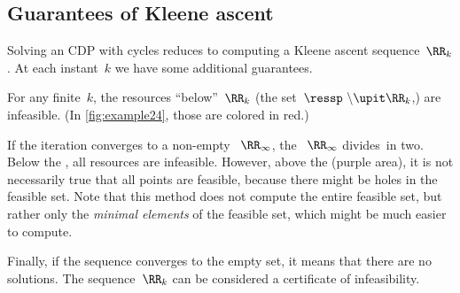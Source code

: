 \subsection{Guarantees of Kleene ascent}

Solving an CDP with cycles reduces to computing a Kleene ascent sequence~$\RR_{k}$.
At each instant~$k$ we have some additional guarantees.

For any finite~$k$, the resources ``below''~$\RR_{k}$ (the set~$\ressp\ \backslash\upit\RR_{k}$,) are infeasible.
(In \cref{fig:example24}, those are colored in red.)

If the iteration converges to a non-empty ~$\RR_{\infty}$, the ~$\RR_{\infty}$ divides~\ressp in two.
Below the , all resources are infeasible.
However, above the  (purple area), it is not necessarily true that all points are feasible, because there might be holes in the feasible set.
Note that this method does not compute the entire feasible set, but rather only the \emph{minimal elements} of the feasible set, which might be much easier to compute.

Finally, if the sequence converges to the empty set, it means that there are no solutions.
The sequence~$\RR_{k}$ can be considered a certificate of infeasibility.
